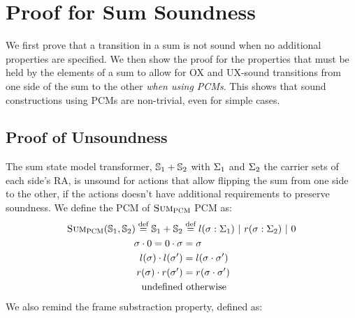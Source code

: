 \chapter{Proof for Sum Soundness} \label{ap:sum-soundness}

We first prove that a transition in a sum is not sound when no additional properties are specified. We then show the proof for the properties that must be held by the elements of a sum to allow for OX and UX-sound transitions from one side of the sum to the other \emph{when using PCMs}. This shows that sound constructions using PCMs are non-trivial, even for simple cases.

\section{Proof of Unsoundness}

The sum state model transformer, $\mathbb S_1 + \mathbb S_2$ with $\Sigma_1$ and $\Sigma_2$ the carrier sets of each side's RA, is unsound for actions that allow flipping the sum from one side to the other, if the actions doesn't have additional requirements to preserve soundness. We define the PCM of $\textsc{Sum}_{\textsc{PCM}}$ PCM as: \begin{align*}
	\textsc{Sum}_{\textsc{PCM}}(\mathbb S_1, \mathbb S_2) \stackrel{\textnormal{def}}= \mathbb S_1 + \mathbb S_2 &\stackrel{\textnormal{def}}= l(\sigma: \Sigma_1) ~|~ r(\sigma: \Sigma_2) ~|~ 0 \\
	\sigma \cdot 0 = 0 \cdot \sigma &= \sigma\\
	l(\sigma) \cdot l(\sigma') &= l(\sigma\cdot\sigma')\\
	r(\sigma) \cdot r(\sigma') &= r(\sigma\cdot\sigma')\\
	\text{undefined}&\text{ otherwise}
\end{align*} We also remind the frame substraction property, defined as:

\newcommand{\swap}[0]{\code{swap}}
\newcommand{\execswap}[2]{\ppexecc{\swap}{#1}{#2}}

